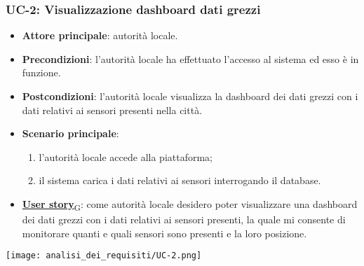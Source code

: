 \subsubsection{UC-2: Visualizzazione dashboard dati grezzi}
\begin{itemize}
	\item \textbf{Attore principale}: autorità locale.
	\item \textbf{Precondizioni}: l'autorità locale ha effettuato l'accesso al sistema ed esso è in funzione.
	\item \textbf{Postcondizioni}: l'autorità locale visualizza la dashboard dei dati grezzi con i dati relativi ai sensori
	      presenti nella città.
	\item \textbf{Scenario principale}:
	      \begin{enumerate}
		      \item l'autorità locale accede alla piattaforma;
		      \item il sistema carica i dati relativi ai sensori interrogando il database.
	      \end{enumerate}
	\item \href{https://7last.github.io/docs/rtb/documentazione-interna/glossario\#user-story}{\textbf{User story}\textsubscript{G}}: come autorità locale desidero poter visualizzare una dashboard dei dati grezzi con i dati relativi ai sensori presenti, la quale mi consente di monitorare quanti e quali sensori sono presenti e la loro posizione.
\end{itemize}
\begin{center}
	\texttt{[image: analisi\_dei\_requisiti/UC-2.png]}
\end{center}

